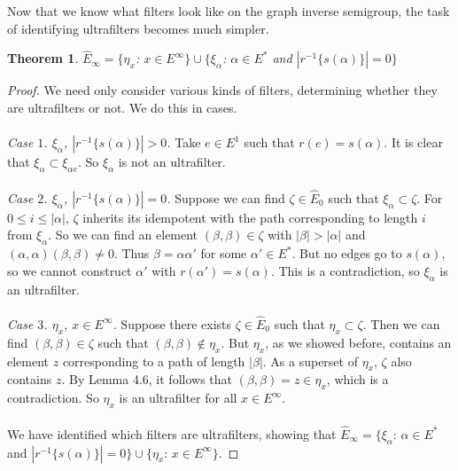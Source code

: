 \documentclass[12pt]{article}
\newtheorem{theorem}{Theorem}[section]
\theoremstyle{definition}
\begin{document}
Now that we know what filters look like on the graph inverse semigroup, the task of identifying ultrafilters becomes much simpler.

\begin{theorem} $\hat{E}_\infty = \{\eta_x$: $x \in E^\infty\} \cup \{\xi_\alpha$: $\alpha \in E^*$ and $|r^{-1}\{s(\alpha)\}| = 0 \}$ \end{theorem}
\begin{proof}
    We need only consider various kinds of filters, determining whether they are ultrafilters or not. We do this in cases.
    \\ \\
    \emph{Case $1$. $\xi_\alpha$, $|r^{-1}\{s(\alpha)\}| > 0$.} Take $e \in E^1$ such that $r(e) = s(\alpha)$. It is clear that
    $\xi_\alpha \subset \xi_{\alpha e}$. So $\xi_\alpha$ is not an ultrafilter.
    \\ \\
    \emph{Case $2$. $\xi_\alpha$, $|r^{-1}\{s(\alpha)\}| = 0$.} Suppose we can find $\zeta \in \hat{E}_0$ such that $\xi_\alpha \subset \zeta$.
    For $0 \leq i \leq |\alpha|$, $\zeta$ inherits its idempotent with the path corresponding to length $i$ from $\xi_\alpha$. So we can find an element $(\beta, \beta) \in \zeta$ with
    $|\beta| > |\alpha|$ and $(\alpha, \alpha)(\beta, \beta) \neq 0$. Thus $\beta = \alpha \alpha'$ for some $\alpha' \in E^*$. But no edges go to $s(\alpha)$, so we cannot
    construct $\alpha'$ with $r(\alpha') = s(\alpha)$. This is a contradiction, so $\xi_\alpha$ is an ultrafilter.
    \\ \\
    \emph{Case $3$. $\eta_x$, $x \in E^\infty$.} Suppose there exists $\zeta \in \hat{E}_0$ such that $\eta_x \subset \zeta$. Then we can find
    $(\beta, \beta) \in \zeta$ such that $(\beta, \beta) \notin \eta_x$. But $\eta_x$, as we showed before, contains an element $z$ corresponding to
    a path of length $|\beta|$. As a superset of $\eta_x$, $\zeta$ also contains $z$. By Lemma 4.6, it follows that $(\beta, \beta) = z \in \eta_x$,
    which is a contradiction. So $\eta_x$ is an ultrafilter for all $x \in E^\infty$.
    \\ \\
    We have identified which filters are ultrafilters, showing that $\hat{E}_\infty = \{\xi_\alpha$: $\alpha \in E^*$ and $|r^{-1}\{s(\alpha)\}| = 0\} \cup \{\eta_x$: $x \in E^\infty\}$.
\end{proof}
\end{document}
